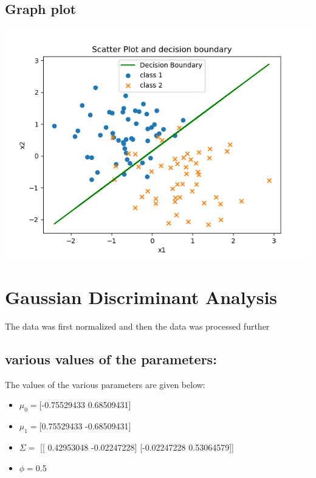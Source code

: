 \documentclass[10pt]{article}
\begin{document}
\subsection{Graph plot}
\begin{center}
\includegraphics[scale=0.8]{newton.png} 
\end{center} 
\newpage
\section{Gaussian Discriminant Analysis}
The data was first normalized and then the data was processed further
\subsection{various values of the parameters:}
The values of the various parameters are given below:
\begin{itemize}
\item $\mu_0=$[-0.75529433  0.68509431]
\item $\mu_1=$[0.75529433  -0.68509431]
\item $\Sigma=$
[[ 0.42953048 -0.02247228]
 [-0.02247228  0.53064579]]
\item $\phi=$0.5
\end{itemize}
\end{document}
